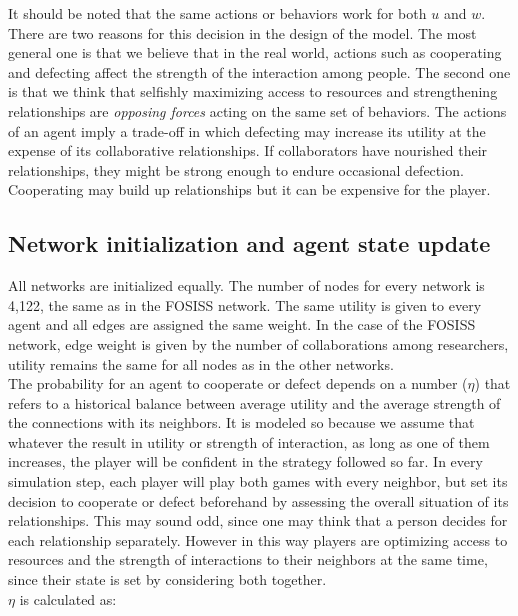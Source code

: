 \documentclass{bmcart}
\begin{document}
It should be noted that the same actions or behaviors work for
  both $u$ and $w$. There are two reasons for this decision in the design of the
model. The most general one is that we believe that in the real world,
actions such as cooperating and defecting affect the strength of the interaction
among people. The second one is that we think that selfishly maximizing access to resources and
strengthening relationships are \emph{opposing forces} acting on the same set of
behaviors. The actions of an agent imply a trade-off in which defecting may
increase its utility at the expense of its collaborative relationships. If
collaborators have nourished their relationships, they might be strong enough to
endure occasional defection. Cooperating may build up relationships but it can be
expensive for the player.

\subsection*{Network initialization and agent state update}

All networks are initialized equally. The number of nodes for every
network is 4,122, the same as in the FOSISS network.  The same utility
is given to every agent and all edges are assigned the same weight. In
the case of the FOSISS network, edge weight is given by the number of
collaborations among researchers, utility remains the same for all
nodes as in the other networks.\\

The probability for an agent to cooperate or defect depends on a
number ($\eta$) that refers to a historical balance between average
utility and the average strength of the connections with its
neighbors. It is modeled so because we assume that whatever the result
in utility or strength of interaction, as long as one of them
increases, the player will be confident in the strategy followed so
far. In every simulation step, each player will play both games with
every neighbor, but set its decision to cooperate or defect beforehand
by assessing the overall situation of its relationships. This may
sound odd, since one may think that a person decides for each
relationship separately. However in this way players are optimizing
access to resources and the strength of interactions to their
neighbors at the same time, since their state is set by
considering both together.\\


$\eta$ is calculated as:\\ 
\end{document}
